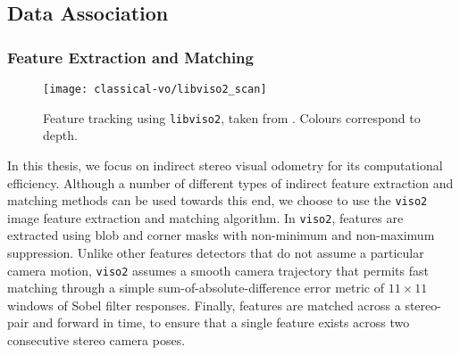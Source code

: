 \subsection{Data Association}
\label{sec:vo_data_extraction}
\subsubsection{Feature Extraction and Matching}

\begin{figure}[h!]
\begin{center}
		\texttt{[image: classical-vo/libviso2\_scan]}
		\caption{Feature tracking using \texttt{libviso2}, taken from \cite{Geiger2011-xe}. Colours correspond to depth.}
  	\label{fig:vo_feature_tracking}
\end{center}
\end{figure}

In this thesis, we focus on indirect stereo visual odometry for its computational efficiency. Although a number of different types of indirect feature extraction and matching methods can be used towards this end, we choose to use the \texttt{viso2} \citep{geiger2011stereoscan} image feature extraction and matching algorithm. In \texttt{viso2}, features are extracted using blob and corner masks with non-minimum and non-maximum suppression. Unlike other features detectors that do not assume a particular camera motion, \texttt{viso2} assumes a smooth camera trajectory that permits fast matching through a simple sum-of-absolute-difference error metric of $11 \times 11$ windows of Sobel filter responses. Finally, features are matched across a stereo-pair and forward in time, to ensure that a single feature exists across two consecutive stereo camera poses. 

